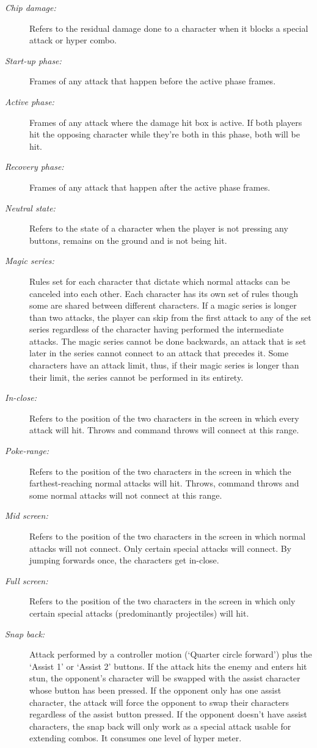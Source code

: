 \documentclass{article}
\begin{document}
\begin{flushleft}
\begin{description}
\item[\textit{Chip damage:}] Refers to the residual damage done to a character when it blocks a special attack or hyper combo.
\item[\textit{Start-up phase:}] Frames of any attack that happen before the active phase frames.
\item[\textit{Active phase:}] Frames of any attack where the damage hit box is active. If both players hit the opposing character while they're both in this phase, both will be hit.
\item[\textit{Recovery phase:}] Frames of any attack that happen after the active phase frames.
\item[\textit{Neutral state:}] Refers to the state of a character when the player is not pressing any buttons, remains on the ground and is not being hit.
\item[\textit{Magic series:}] Rules set for each character that dictate which normal attacks can be canceled into each other. Each character has its own set of rules though some are shared between different characters. If a magic series is longer than two attacks, the player can skip from the first attack to any of the set series regardless of the character having performed the intermediate attacks. The magic series cannot be done backwards, an attack that is set later in the series cannot connect to an attack that precedes it. Some characters have an attack limit, thus, if their magic series is longer than their limit, the series cannot be performed in its entirety.
\item[\textit{In-close:}] Refers to the position of the two characters in the screen in which every attack will hit. Throws and command throws will connect at this range.
\item[\textit{Poke-range:}] Refers to the position of the two characters in the screen in which the farthest-reaching normal attacks will hit. Throws, command throws and some normal attacks will not connect at this range.
\item[\textit{Mid screen:}] Refers to the position of the two characters in the screen in which normal attacks will not connect. Only certain special attacks will connect. By jumping forwards once, the characters get in-close.
\item[\textit{Full screen:}] Refers to the position of the two characters in the screen in which only certain special attacks (predominantly projectiles) will hit.
\item[\textit{Snap back:}] Attack performed by a controller motion (`Quarter circle forward') plus the `Assist 1' or `Assist 2' buttons. If the attack hits the enemy and enters hit stun, the opponent's character will be swapped with the assist character whose button has been pressed. If the opponent only has one assist character, the attack will force the opponent to swap their characters regardless of the assist button pressed. If the opponent doesn't have assist characters, the snap back will only work as a special attack usable for extending combos. It consumes one level of hyper meter.

\end{description}
\end{flushleft}
\end{document}
